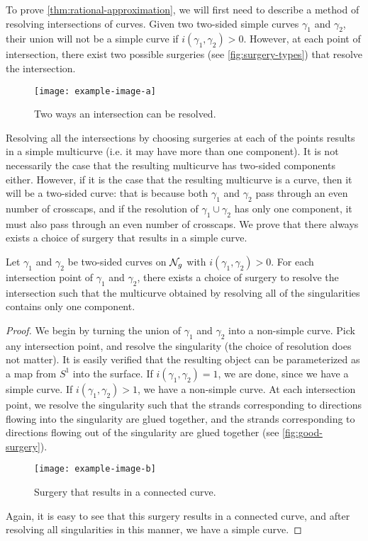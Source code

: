 \documentclass[12pt, reqno]{amsart}
\begin{document}
To prove \autoref{thm:rational-approximation}, we will first need to describe a method of resolving intersections of curves.
Given two two-sided simple curves $\gamma_1$ and $\gamma_2$, their union will not be a simple curve if $i(\gamma_1, \gamma_2) > 0$.
However, at each point of intersection, there exist two possible surgeries (see \autoref{fig:surgery-types}) that resolve the intersection.
\begin{figure}[h]
  \centering
  \texttt{[image: example-image-a]}
  \caption{Two ways an intersection can be resolved.}
  \label{fig:surgery-types}
\end{figure}
Resolving all the intersections by choosing surgeries at each of the points results in a simple multicurve (i.e. it may have more than one component).
It is not necessarily the case that the resulting multicurve has two-sided components either.
However, if it is the case that the resulting multicurve is a curve, then it will be a two-sided curve: that is because both $\gamma_1$ and $\gamma_2$ pass through an even number of crosscaps, and if the resolution of $\gamma_1 \cup \gamma_2$ has only one component, it must also pass through an even number of crosscaps.
We prove that there always exists a choice of surgery that results in a simple curve.
\begin{lemma}
  \label{lem:valid-surgery}
  Let $\gamma_1$ and $\gamma_2$ be two-sided curves on $\mathcal{N}_g$ with $i(\gamma_1, \gamma_2) > 0$.
  For each intersection point of $\gamma_1$ and $\gamma_2$, there exists a choice of surgery to resolve the intersection such that the multicurve obtained by resolving all of the singularities contains only one component.
\end{lemma}
\begin{proof}
  We begin by turning the union of $\gamma_1$ and $\gamma_2$ into a non-simple curve.
  Pick any intersection point, and resolve the singularity (the choice of resolution does not matter).
  It is easily verified that the resulting object can be parameterized as a map from $S^1$ into the surface.
  If $i(\gamma_1, \gamma_2) = 1$, we are done, since we have a simple curve.
  If $i(\gamma_1, \gamma_2) > 1$, we have a non-simple curve.
  At each intersection point, we resolve the singularity such that the strands corresponding to directions flowing into the singularity are glued together, and the strands corresponding to directions flowing out of the singularity are glued together (see \autoref{fig:good-surgery}).
  \begin{figure}[h]
    \centering
    \texttt{[image: example-image-b]}
    \caption{Surgery that results in a connected curve.}
    \label{fig:good-surgery}
  \end{figure}
Again, it is easy to see that this surgery results in a connected curve, and after resolving all singularities in this manner, we have a simple curve.
\end{proof}
\end{document}

